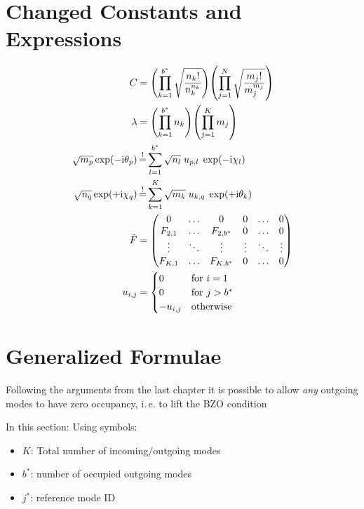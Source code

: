\documentclass[
	english,
	a4paper,
	fontsize=10pt,
	parskip=half,
	titlepage=true,
	DIV=12,
	final
]{scrreprt}
\newcommand*{\ie}{i.\,e.\xspace}
\newcommand*{\iunit}{\ensuremath{\mathrm{i}}}
\newcommand*{\equalCond}{  \mathop{=}\limits^!  }
\begin{document}
\section{Changed Constants and Expressions}
\begin{align}
	C
&=
	\qty( \prod_{k=1}^{b^*}
		\sqrt{\frac
			{ n_k! }
			{ n_k^{n_k} }
		}
	)
	\qty( \prod_{j=1}^{N}
		\sqrt{\frac
			{ m_j! }
			{ m_j^{m_j} }
		}
	)
\label{eqn:DefC_n}
\\
	\lambda
&=
	\qty( \prod_{k=1}^{b^*} n_k )
	\qty( \prod_{j=1}^{K}   m_j )
\label{eqn:DefLambda_n}
\\
	\sqrt{m_p} \exp(-\iunit \theta_p)
&\equalCond
	\sum_{l=1}^{b^*} \sqrt{n_l} \; u_{p,l} \; \exp(-\iunit\chi_l)
\label{eqn:FourierLinkForward_n}
\\
	\sqrt{n_q} \exp(+\iunit \chi_q)
&\equalCond
	\sum_{k=1}^{K}
	\sqrt{m_k} \; u_{k,q} \; \exp(+\iunit\theta_k)
\label{eqn:FourierLinkBackward_n}
\\
	\tilde{F}
&=
	\begin{pmatrix}
		0		& \ldots & 0				& 0		& \ldots & 0 \\
		F_{2,1}	& \ldots & F_{2, b^*}	& 0		& \ldots & 0 \\
		\vdots	& \ddots	 & \vdots		& \vdots	& \ddots & \vdots \\
		F_{K,1} & \ldots & F_{K, b^*}	& 0		& \ldots & 0
	\end{pmatrix}
\label{eqn:DefFTilda_n}
\\
	u_{i,j}
&=
	\begin{cases}
		0			& \text{for } i = 1 \\
		0			& \text{for } j > b^* \\
		-u_{i,j}		& \text{otherwise}
	\end{cases}
\label{eqn:DefReducedDFTNonBZO_n}
\end{align}

\section{Generalized Formulae}
Following the arguments from the last chapter it is possible to allow \emph{any} outgoing modes to have zero occupancy, \ie to lift the BZO condition

In this section: Using symbols:
\begin{itemize}
\item $K$: Total number of incoming/outgoing modes
\item $b^*$: number of occupied outgoing modes
\item $j^*$: reference mode ID
\end{itemize}
\end{document}
